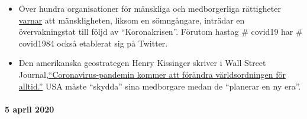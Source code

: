 \begin{itemize}
{  till över sex miljoner}, ett historiskt unikt värde sedan den stora
  depressionen 1929.
\item
  Över hundra organisationer för mänskliga och medborgerliga rättigheter
  \href{https://www.dailymail.co.uk/news/article-8181381/World-sleepwalking-surveillance-state-rights-groups-warn.html}{varnar}
  att mänskligheten, liksom en sömngångare, inträdar en övervakningstat
  till följd av ``Koronakrisen''. Förutom hastag \# covid19 har \#
  covid1984 också etablerat sig på Twitter.
\item
  Den amerikanska geostrategen Henry Kissinger skriver i Wall Street
  Journal,\href{https://www.wsj.com/articles/the-coronavirus-pandemic-will-forever-alter-the-world-order-11585953005}{``Coronavirus-pandemin
  kommer att förändra världsordningen för alltid.''} USA måste
  ``skydda'' sina medborgare medan de ``planerar en ny era''.
\end{itemize}

\hypertarget{5-april-2020}{%
\paragraph{5 april 2020}\label{5-april-2020}}

